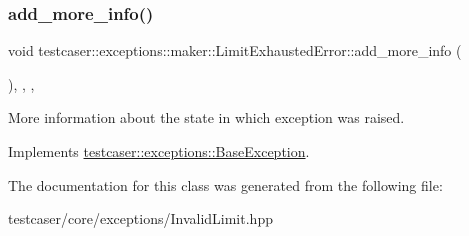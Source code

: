 \subsubsection{\texorpdfstring{add\_more\_info()}{add\_more\_info()}}
{\footnotesize\ttfamily void testcaser\+::exceptions\+::maker\+::\+Limit\+Exhausted\+Error\+::add\+\_\+more\+\_\+info (\begin{DoxyParamCaption}{ }\end{DoxyParamCaption})\hspace{0.3cm}{\ttfamily [inline]}, {\ttfamily [final]}, {\ttfamily [override]}, {\ttfamily [virtual]}}



More information about the state in which exception was raised. 



Implements \mbox{\hyperlink{classtestcaser_1_1exceptions_1_1BaseException_ad607ea04e2cb4ad9b8d0e2e6b6734f2f}{testcaser\+::exceptions\+::\+Base\+Exception}}.



The documentation for this class was generated from the following file\+:\begin{DoxyCompactItemize}
\item 
testcaser/core/exceptions/Invalid\+Limit.\+hpp\end{DoxyCompactItemize}

